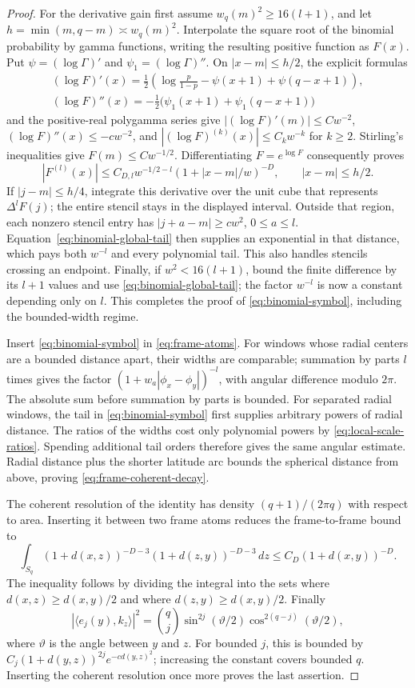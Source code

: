\begin{proof}
For the derivative gain first assume $w_q(m)^2\geq16(l+1)$, and let
$h=\min(m,q-m)\asymp w_q(m)^2$.  Interpolate the square root of the
binomial probability by gamma functions, writing the resulting
positive function as $F(x)$.  Put $\psi=(\log\Gamma)'$ and
$\psi_1=(\log\Gamma)''$.  On $|x-m|\leq h/2$, the explicit
formulas
\[
 \begin{aligned}
 (\log F)'(x)=\tfrac12\left(\log\frac p{1-p}
          -\psi(x+1)+\psi(q-x+1)\right),\\
 (\log F)''(x)=-\tfrac12\bigl(\psi_1(x+1)+\psi_1(q-x+1)\bigr)
 \end{aligned}
\]
and the positive-real polygamma series give
$|(\log F)'(m)|\leq Cw^{-2}$,
$(\log F)''(x)\leq-cw^{-2}$, and
$|(\log F)^{(k)}(x)|\leq C_kw^{-k}$ for $k\geq2$.
Stirling's inequalities give $F(m)\leq Cw^{-1/2}$.
Differentiating $F=e^{\log F}$ consequently proves
\[
 |F^{(l)}(x)|\leq C_{D,l}w^{-1/2-l}
                    (1+|x-m|/w)^{-D},\qquad |x-m|\leq h/2.
\]
If $|j-m|\leq h/4$, integrate this derivative over the unit cube
that represents $\Delta^lF(j)$; the entire stencil stays in the
displayed interval.  Outside that region, each nonzero stencil
entry has $|j+a-m|\geq cw^2$, $0\leq a\leq l$.
Equation~\eqref{eq:binomial-global-tail} then supplies an
exponential in that distance, which pays both $w^{-l}$ and every
polynomial tail.  This also handles stencils crossing an endpoint.
Finally, if $w^2<16(l+1)$, bound the finite difference by its $l+1$
values and use \eqref{eq:binomial-global-tail}; the factor $w^{-l}$
is now a constant depending only on $l$.  This completes the proof
of \eqref{eq:binomial-symbol}, including the bounded-width regime.

Insert \eqref{eq:binomial-symbol} in \eqref{eq:frame-atoms}.  For windows
whose radial centers are a bounded distance apart, their widths are
comparable; summation by parts $l$ times gives the factor
$(1+w_a|\phi_x-\phi_y|)^{-l}$, with angular difference modulo $2\pi$.
The absolute sum before summation by parts is bounded.  For separated
radial windows, the tail in \eqref{eq:binomial-symbol} first supplies
arbitrary powers of radial distance.  The ratios of the widths cost
only polynomial powers by \eqref{eq:local-scale-ratios}.  Spending
additional tail orders therefore gives the same angular estimate.
Radial distance plus the shorter latitude arc bounds the spherical
distance from above, proving \eqref{eq:frame-coherent-decay}.

The coherent resolution of the identity has density
$(q+1)/(2\pi q)$ with respect to area.  Inserting it between two frame
atoms reduces the frame-to-frame bound to
\[
 \int_{S_q}(1+d(x,z))^{-D-3}(1+d(z,y))^{-D-3}\,dz
 \leq C_D(1+d(x,y))^{-D}.
\]
The inequality follows by dividing the integral into the sets where
$d(x,z)\geq d(x,y)/2$ and where $d(z,y)\geq d(x,y)/2$.
Finally
\[
 |\langle e_j(y),k_z\rangle|^2
 =\binom qj\sin^{2j}(\vartheta/2)\cos^{2(q-j)}(\vartheta/2),
\]
where $\vartheta$ is the angle between $y$ and $z$.  For bounded $j$,
this is bounded by $C_j(1+d(y,z))^{2j}e^{-c d(y,z)^2}$; increasing the
constant covers bounded $q$.  Inserting the coherent resolution once
more proves the last assertion.
\end{proof}

